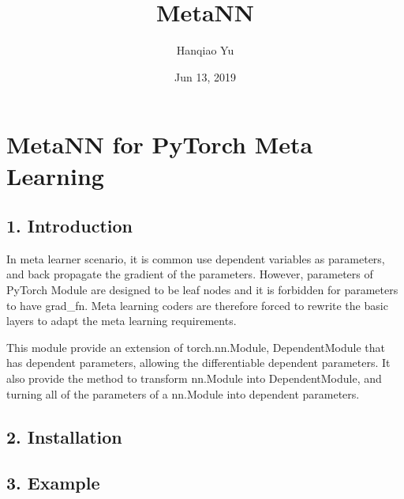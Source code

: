 \documentclass[letterpaper,10pt,english]{sphinxmanual}
\title{MetaNN}
\date{Jun 13, 2019}
\author{Hanqiao Yu}
\begin{document}
\pagestyle{empty}
\sphinxmaketitle
\pagestyle{plain}
\sphinxtableofcontents
\pagestyle{normal}
\label{\detokenize{index::doc}}



\chapter{MetaNN for PyTorch Meta Learning}
\label{\detokenize{readme_link:metann-for-pytorch-meta-learning}}\label{\detokenize{readme_link::doc}}

\section{1. Introduction}
\label{\detokenize{readme_link:introduction}}
In meta learner scenario, it is common use dependent variables as parameters, and back propagate the gradient of the parameters. However, parameters of PyTorch Module are designed to be leaf nodes and it is forbidden for parameters to have grad\_fn. Meta learning coders are therefore forced to rewrite the basic layers to adapt the meta learning requirements.

This module provide an extension of torch.nn.Module, DependentModule that has dependent parameters, allowing the differentiable dependent parameters. It also provide the method to transform nn.Module into DependentModule, and turning all of the parameters of a nn.Module into dependent parameters.


\section{2. Installation}
\label{\detokenize{readme_link:installation}}
\begin{sphinxVerbatim}[commandchars=\\\{\}]
  
\end{sphinxVerbatim}


\section{3. Example}
\label{\detokenize{readme_link:example}}
\begin{sphinxVerbatim}[commandchars=\\\{\}]
    
   
  
     
     
  
\end{sphinxVerbatim}
\end{document}
